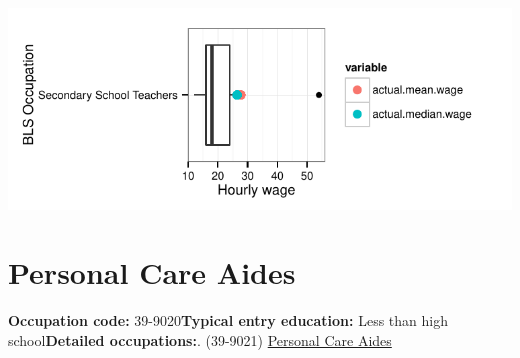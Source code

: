 \documentclass[a4paper,10pt]{article}\usepackage[]{graphicx}\usepackage[]{color}
\makeatletter
\def\maxwidth{ %
  \ifdim\Gin@nat@width>\linewidth
    \linewidth
  \else
    \Gin@nat@width
  \fi
}
\makeatother
\begin{document}
{\centering \includegraphics[width=\maxwidth]{figure/unnamed-chunk-228} 

}


\newpage\section{Personal Care Aides}\textbf{Occupation code:} 39-9020\newline\textbf{Typical entry education:} Less than high school\newline\textbf{Detailed occupations:}. (39-9021)  \href{http://www.bls.gov/oes/current/oes399021.htm}{Personal Care Aides}\newline%
\end{document}
